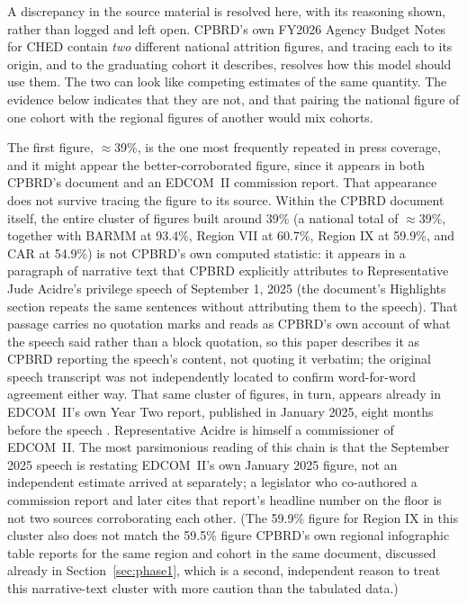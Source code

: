 \documentclass[11pt]{article}
\begin{document}
A discrepancy in the source material is resolved here, with its reasoning shown, rather than logged and left open. CPBRD's own FY2026 Agency Budget Notes for CHED contain \emph{two} different national attrition figures, and tracing each to its origin, and to the graduating cohort it describes, resolves how this model should use them. The two can look like competing estimates of the same quantity. The evidence below indicates that they are not, and that pairing the national figure of one cohort with the regional figures of another would mix cohorts.

The first figure, $\approx$39\%, is the one most frequently repeated in press coverage, and it might appear the better-corroborated figure, since it appears in both CPBRD's document and an EDCOM~II commission report. That appearance does not survive tracing the figure to its source. Within the CPBRD document itself, the entire cluster of figures built around 39\% (a national total of $\approx$39\%, together with BARMM at 93.4\%, Region VII at 60.7\%, Region IX at 59.9\%, and CAR at 54.9\%) is not CPBRD's own computed statistic: it appears in a paragraph of narrative text that CPBRD explicitly attributes to Representative Jude Acidre's privilege speech of September 1, 2025 \citep{cpbrd2026} (the document's Highlights section repeats the same sentences without attributing them to the speech). That passage carries no quotation marks and reads as CPBRD's own account of what the speech said rather than a block quotation, so this paper describes it as CPBRD reporting the speech's content, not quoting it verbatim; the original speech transcript was not independently located to confirm word-for-word agreement either way. That same cluster of figures, in turn, appears already in EDCOM~II's own Year Two report, published in January 2025, eight months before the speech \citep{edcom2025y2}. Representative Acidre is himself a commissioner of EDCOM~II. The most parsimonious reading of this chain is that the September 2025 speech is restating EDCOM~II's own January 2025 figure, not an independent estimate arrived at separately; a legislator who co-authored a commission report and later cites that report's headline number on the floor is not two sources corroborating each other. (The 59.9\% figure for Region IX in this cluster also does not match the 59.5\% figure CPBRD's own regional infographic table reports for the same region and cohort in the same document, discussed already in Section~\ref{sec:phase1}, which is a second, independent reason to treat this narrative-text cluster with more caution than the tabulated data.)
\end{document}

